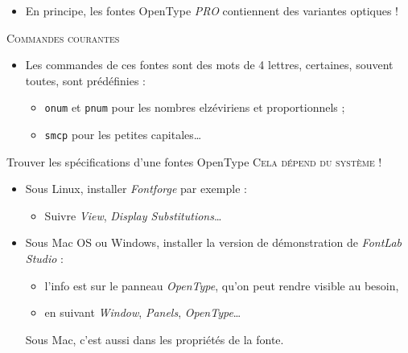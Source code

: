 \documentclass[12pt,a4paper,twocolumn]{book} %
\def\ogla{{\fontfamily{fi4}\selectfont<<}}
\def\fgla{{\fontfamily{fi4}\selectfont>>}}
\begin{document}
{\begin{itemize}
			                    
				            {\selectfont\itshape
				              Quelles= superbes= questions= !}
				            
	                                    
			                    
				            
				            Regardez attentivement petites capitales penchées et les \ogla s \fgla !
				            
				            Il faut, bien sûr, que la fonte considérée le permette !
				          \item  En principe, les fontes OpenType \textit{PRO} contiennent des variantes optiques !
                                          \end{itemize}
                                          {\textsc{Commandes courantes}}
			                  
			                  \begin{itemize}
				          \item Les commandes de ces fontes sont des mots de 4 lettres, certaines, souvent toutes, sont prédéfinies :
				            \begin{itemize}
					    \item \texttt{onum} et \texttt{pnum} pour les nombres elzéviriens et proportionnels ;
					    \item \texttt{smcp} pour les petites capitales\dots
				            \end{itemize}
			                  \end{itemize}		
		                          
		                          
	                                  {Trouver les spécifications d'une fontes OpenType}	
                                          {\textsc{Cela dépend du système !}}
                                          \begin{itemize}
                                          \item Sous Linux, installer \textit{Fontforge} par exemple :
			                    \begin{itemize}
				            \item Suivre \textit{View}, \textit{Display Substitutions}\dots
			                    \end{itemize}
	                                  \item Sous Mac OS ou Windows, installer la version de démonstration de \textit{FontLab Studio} :
			                    \begin{itemize}
				            \item l'info est sur le panneau \textit{OpenType}, qu'on peut rendre visible au besoin,
				            \item en suivant \textit{Window}, \textit{Panels}, \textit{OpenType}\dots
			                    \end{itemize}
			                    Sous Mac, c'est aussi dans les propriétés de la fonte.
	                                  \end{itemize}		
		                          
}
\end{document}
